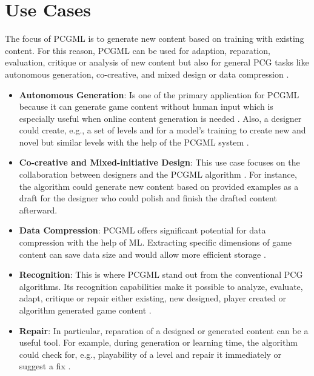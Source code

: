\documentclass[MGS,Master,english]{twbook}%
\begin{document}
\section{Use Cases}
The focus of \ac{PCGML} is to generate new content based on training with existing content. For this reason, \ac{PCGML} can be used for adaption, reparation, evaluation, critique or analysis of new content but also for general \ac{PCG} tasks like autonomous generation, co-creative, and mixed design or data compression \cite{pcgml::paper}.
\begin{itemize}
	\item \textbf{Autonomous Generation}: Is one of the primary application for \ac{PCGML} because it can generate game content without human input which is especially useful when online content generation is needed \cite{pcgml::paper}. Also, a designer could create, e.g., a set of levels and for a model's training to create new and novel but similar levels with the help of the \ac{PCGML} system \cite{pcgml::paper}.
	\item \textbf{Co-creative and Mixed-initiative Design}: This use case focuses on the collaboration between designers and the \ac{PCGML} algorithm \cite{pcgml::paper}. For instance, the algorithm could generate new content based on provided examples as a draft for the designer who could polish and finish the drafted content afterward.
	\item \textbf{Data Compression}: \ac{PCGML} offers significant potential for data compression with the help of \ac{ML}. Extracting specific dimensions of game content can save data size and would allow more efficient storage \cite{pcgml::paper}.
	\item \textbf{Recognition}: This is where \ac{PCGML} stand out from the conventional \ac{PCG} algorithms. Its  recognition capabilities make it possible to analyze, evaluate, adapt, critique or repair either existing, new designed, player created or algorithm generated game content \cite{pcgml::paper}. 
	\item \textbf{Repair}: In particular, reparation of a designed or generated content can be a useful tool. For example, during generation or learning time, the algorithm could check for, e.g., playability of a level and repair it immediately or suggest a fix \cite{pcgml::paper}.
\end{itemize}
\end{document}
